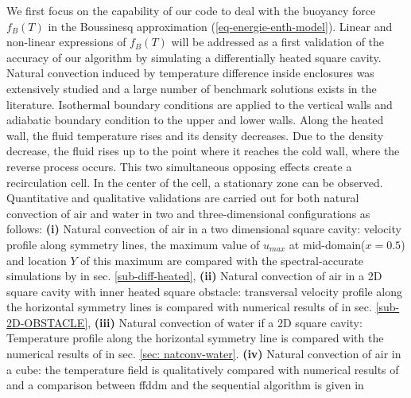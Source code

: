 We first focus on the capability of our code to deal with the buoyancy force $f_B(T)$ in the Boussinesq approximation (\ref{eq-energie-enth-model}).
Linear and non-linear expressions of $f_B(T)$ will be addressed as a first validation of the accuracy of our algorithm by simulating a differentially heated square cavity.
Natural convection induced by temperature difference inside enclosures was extensively studied and a large number of benchmark solutions exists in the literature.
Isothermal boundary conditions are applied to the vertical walls and adiabatic boundary condition to the upper and lower walls.
Along the heated wall, the fluid temperature rises and its density decreases. 
Due to the density decrease, the fluid rises up to the point where it reaches the cold wall, where the reverse process occurs. 
This two simultaneous opposing effects create a recirculation cell. In the center of the cell, a stationary zone can be observed.
Quantitative and qualitative validations are carried out for both natural convection of air and water in two and three-dimensional configurations as follows: \newline{}
{\bf(i)} Natural convection of air in a two dimensional square cavity: velocity profile along symmetry lines, the maximum value of $u_{max}$ at mid-domain($x=0.5$) and location $Y$ of this maximum  are compared with the spectral-accurate simulations by \cite{LeQuere91} in sec. \ref{sub-diff-heated}, \newline{}
{\bf(ii)} Natural convection of air in a 2D square cavity with inner heated square obstacle: transversal velocity profile along the  horizontal symmetry lines is compared with numerical results of \cite{Raluca2013} 
in sec. \ref{sub-2D-OBSTACLE}, \newline{}
{\bf(iii)} Natural convection of water if a 2D square cavity: Temperature profile along the horizontal symmetry line is compared with the numerical results of \cite{Kowalewski-2003} in sec. \ref{sec: natconv-water}.
{\bf(iv)} Natural convection of air in a cube: the temperature field is qualitatively compared with numerical results of \cite{Wakashima-2004} and a comparison between ffddm and the sequential algorithm is given in 

